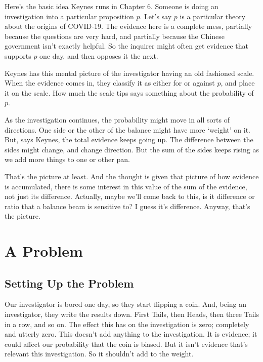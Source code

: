 \documentclass[
  11pt,
  letterpaper,
  DIV=11,
  numbers=noendperiod,
  oneside]{scrartcl}
\begin{document}
Here's the basic idea Keynes runs in Chapter 6. Someone is doing an
investigation into a particular proposition \(p\). Let's say \(p\) is a
particular theory about the origins of COVID-19. The evidence here is a complete mess,
partially because the questions are very hard, and partially because the
Chinese government isn't exactly helpful. So the inquirer might often get
evidence that supports \(p\) one day, and then opposes it the next.

Keynes has this mental picture of the investigator having an old
fashioned scale. When the evidence comes in, they classify it as either
for or against \(p\), and place it on the scale. How much the scale tips
says something about the probability of \(p\).

As the investigation continues, the probability might move in all sorts
of directions. One side or the other of the balance might have more
`weight' on it. But, says Keynes, the total evidence keeps going up. The
difference between the sides might change, and change direction. But the
sum of the sides keeps rising as we add more things to one or other pan.

That's the picture at least. And the thought is given that picture of
how evidence is accumulated, there is some interest in this value of the
sum of the evidence, not just its difference. Actually, maybe we'll come
back to this, is it difference or ratio that a balance beam is sensitive
to? I guess it's difference. Anyway, that's the picture.

\section{A Problem}\label{a-problem}

\subsection{Setting Up the Problem}\label{setting-up-the-problem}

Our investigator is bored one day, so they start flipping a coin. And,
being an investigator, they write the results down. First Tails, then
Heads, then three Tails in a row, and so on. The effect this has on the
investigation is zero; completely and utterly zero. This doesn't add
anything to the investigation. It is evidence; it could affect our
probability that the coin is biased. But it isn't evidence that's
relevant this investigation. So
it shouldn't add to the weight.
\end{document}
